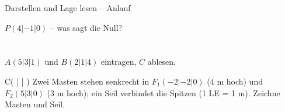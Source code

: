\setcounter{aufgabe}{0}

\begin{aufgabe}{Darstellen und Lage lesen – Anlauf}
\begin{teile}
\teil $P(4 | -1 | 0)$ – was sagt die Null? \\  \\  \\ 
\teil $A(5 | 3 | 1)$ und $B(2 | 1 | 4)$ eintragen, $C$ ablesen.

\begin{ksys3}  \end{ksys3}
C( \leerfeld | \leerfeld | \leerfeld )
\teil Zwei Masten stehen senkrecht in $F_1(-2 | -2 | 0)$ ($4$ m hoch) und $F_2(5 | 3 | 0)$ ($3$ m hoch); ein Seil verbindet die Spitzen (1 LE = 1 m). Zeichne Masten und Seil.

\begin{ksys3} \end{ksys3}
\end{teile}
\end{aufgabe}

